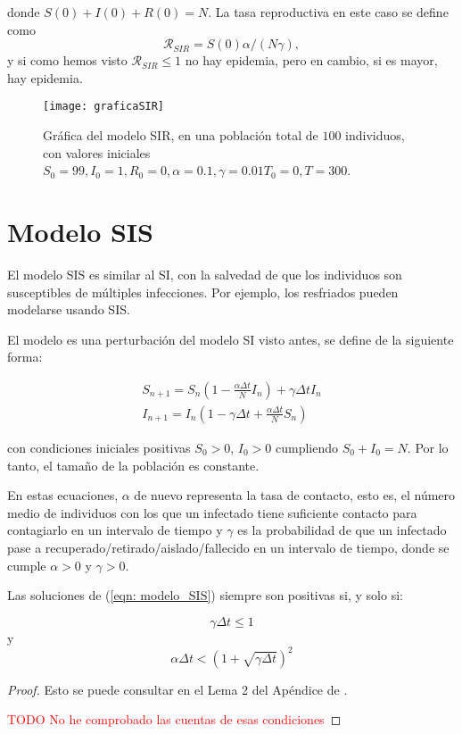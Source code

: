 donde $S(0)+I(0)+R(0)=N$. La tasa reproductiva en este caso se define como
$$\mathcal{R}_{SIR}=S(0)\alpha /(N\gamma ),$$
y si como hemos visto $\mathcal{R}_{SIR}\leq 1$  no hay epidemia, pero en cambio, si es mayor, hay epidemia.

\begin{figure}
\begin{center}
\caption{Gráfica del modelo SIR, en una población total de $100$ individuos, con valores iniciales $S_0=99, I_0 = 1, R_0 = 0, \alpha = 0.1, \gamma = 0.01 T_0 = 0, T = 300$.}
\texttt{[image: graficaSIR]}
\end{center}
\end{figure}


\section{Modelo SIS}
El modelo SIS es similar al SI, con la salvedad de que los individuos son susceptibles de múltiples infecciones.
Por ejemplo, los resfriados pueden modelarse usando SIS.

El modelo es una perturbación del modelo SI visto antes, se define de la siguiente forma:

\begin{equation}
\label{eqn: modelo_SIS}
\begin{aligned}
S_{n+1} = S_n \left(1-\frac{\alpha\Delta t}{N} I_n \right) + \gamma \Delta t I_n \\
I_{n+1} = I_n \left( 1-\gamma \Delta t + \frac{\alpha\Delta t}{N} S_n \right)
\end{aligned}
\end{equation}

con condiciones iniciales positivas $S_0>0$, $I_0>0$ cumpliendo $S_0+I_0=N$. Por lo tanto, el tamaño de la población es constante.

En estas ecuaciones, $\alpha$ de nuevo representa la tasa de contacto, esto es, el número medio de individuos con los que un infectado tiene suficiente contacto para contagiarlo en un intervalo de tiempo y $\gamma$ es la probabilidad de que un infectado pase a recuperado/retirado/aislado/fallecido en un intervalo de tiempo, donde se cumple $\alpha >0$ y $\gamma >0$.

\begin{proposition}
Las soluciones de (\ref{eqn: modelo_SIS}) siempre son positivas si, y solo si:

$$\gamma \Delta t \leq 1 $$ y $$\alpha\Delta t< \left( 1+\sqrt{\gamma \Delta t} \right)^2$$

\end{proposition}
\begin{proof}
Esto se puede consultar en el Lema 2 del Apéndice de \cite{allenDiscretetimeSISIR1994}.

\textcolor{red}{TODO No he comprobado las cuentas de esas condiciones}
\end{proof}

